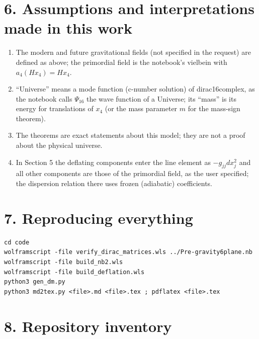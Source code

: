 \documentclass[10pt]{article}
\begin{document}
\section*{6. Assumptions and interpretations made in this work}

\begin{enumerate}
\item The modern and future gravitational fields (not specified in the request) are defined as above; the primordial field is the notebook's vielbein with $a_4(Hx_4) = Hx_4$.
\item ``Universe'' means a mode function (c-number solution) of dirac16complex, as the notebook calls $\Psi_{16}$ the wave function of a Universe; its ``mass'' is its energy for translations of $x_4$ (or the mass parameter $m$ for the mass-sign theorem).
\item The theorems are exact statements about this model; they are not a proof about the physical universe.
\item In Section 5 the deflating components enter the line element as $-g_{jj}dx_j^2$ and all other components are those of the primordial field, as the user specified; the dispersion relation there uses frozen (adiabatic) coefficients.
\end{enumerate}

\section*{7. Reproducing everything}

\begin{lstlisting}
cd code
wolframscript -file verify_dirac_matrices.wls ../Pre-gravity6plane.nb
wolframscript -file build_nb2.wls
wolframscript -file build_deflation.wls
python3 gen_dm.py
python3 md2tex.py <file>.md <file>.tex ; pdflatex <file>.tex
\end{lstlisting}

\section*{8. Repository inventory}
\end{document}
